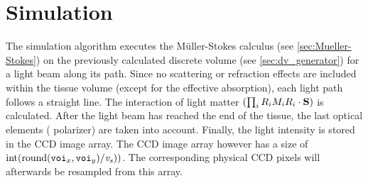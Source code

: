 \section{Simulation}
\label{sec:simulation}
% 
The simulation algorithm executes the M\"uller-Stokes calculus (see \cref{sec:Mueller-Stokes}) on the previously calculated discrete volume (see \cref{sec:dv_generator}) for a light beam along its path.
Since no scattering or refraction effects are included within the tissue volume (except for the effective absorption), each light path follows a straight line.
The interaction of light matter $\left( \prod_i R_i M_i R_i \cdot \vv{S} \right)$ is calculated. 
After the light beam has reached the end of the tissue, the last optical elements (\eg{} polarizer) are taken into account.
Finally, the light intensity is stored in the \acs{CCD} image array.
The \ac{CCD} image array however has a size of $\integer{}(\round((\voi_x,\voi_y)/\voxels))$.
The corresponding physical \ac{CCD} pixels will afterwards be resampled from this array.
\\
%
